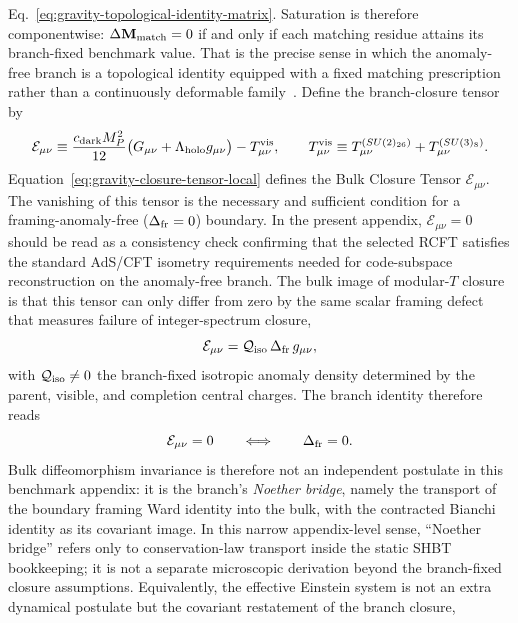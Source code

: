 \documentclass[11pt]{article}
\begin{document}
Eq.~\eqref{eq:gravity-topological-identity-matrix}. Saturation is therefore
componentwise: $\Delta\mathbf M_{\rm match}=0$ if and only if each matching
residue attains its branch-fixed benchmark value. That is the precise sense in
which the anomaly-free branch is a topological identity equipped with a fixed
matching prescription rather than a continuously deformable family~\cite{georgi1979,babu1993,friedan1987,witten1989}.
Define the branch-closure tensor by
\begin{equation}
\label{eq:gravity-closure-tensor-local}
 \mathcal E_{\mu\nu}
 \equiv
 \frac{c_{\rm dark}M_P^2}{12}\bigl(G_{\mu\nu}+\Lambda_{\rm holo}g_{\mu\nu}\bigr)
 -T^{\rm vis}_{\mu\nu},
 \qquad
 T^{\rm vis}_{\mu\nu}
 \equiv
 T^{(SU(2)_{26})}_{\mu\nu}+T^{(SU(3)_8)}_{\mu\nu}.
\end{equation}
Equation~\eqref{eq:gravity-closure-tensor-local} defines the Bulk Closure Tensor $\mathcal E_{\mu\nu}$. The vanishing of this tensor is the necessary and sufficient condition for a framing-anomaly-free ($\Delta_{\rm fr}=0$) boundary. In the present appendix, $\mathcal E_{\mu\nu}=0$ should be read as a consistency check confirming that the selected RCFT satisfies the standard AdS/CFT isometry requirements needed for code-subspace reconstruction on the anomaly-free branch. The bulk image of modular-$T$ closure is that this tensor can only differ from zero by the same scalar framing defect that measures failure of integer-spectrum closure,
\begin{equation}
\label{eq:gravity-topological-identity-local}
 \mathcal E_{\mu\nu}=\mathcal Q_{\rm iso}\,\Delta_{\rm fr}\,g_{\mu\nu},
\end{equation}
with $\mathcal Q_{\rm iso}\neq 0$ the branch-fixed isotropic anomaly density
determined by the parent, visible, and completion central charges. The branch
identity therefore reads
\begin{equation}
 \mathcal E_{\mu\nu}=0
 \qquad\Longleftrightarrow\qquad
 \Delta_{\rm fr}=0.
\end{equation}
Bulk diffeomorphism invariance is therefore not an independent postulate in
this benchmark appendix: it is the branch's \emph{Noether bridge}, namely the
transport of the boundary framing Ward identity into the bulk, with the
contracted Bianchi identity as its covariant image. In this narrow
appendix-level sense, ``Noether bridge'' refers only to conservation-law
transport inside the static SHBT bookkeeping; it is not a separate microscopic
derivation beyond the branch-fixed closure assumptions.
Equivalently, the effective Einstein system is not an extra dynamical postulate but the covariant restatement of the branch closure,
\end{document}
